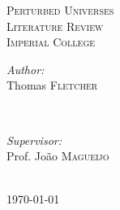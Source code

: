 \documentclass[12pt]{article} %
\begin{document}

\begin{titlepage}

\newcommand{\HRule}{\rule{\linewidth}{0.5mm}} %

\center %


\textsc{\LARGE Perturbed Universes}\\[0.5cm] %
\textsc{\Large Literature Review}\\[0.5cm] %

\textsc{\large Imperial College}\\[1.5cm] %

\begin{minipage}{0.4\textwidth}
\begin{flushleft} \large
\emph{Author:}\\
Thomas \textsc{Fletcher} %
\end{flushleft}
\end{minipage}
~
\begin{minipage}{0.4\textwidth}
\begin{flushright} \large
\emph{Supervisor:} \\
Prof. Jo\~{a}o  \textsc{Magueijo} %
\end{flushright}
\end{minipage}\\[4cm]

{\large \today}\\[3cm] %


\vfill %

\end{titlepage}

\end{document}
